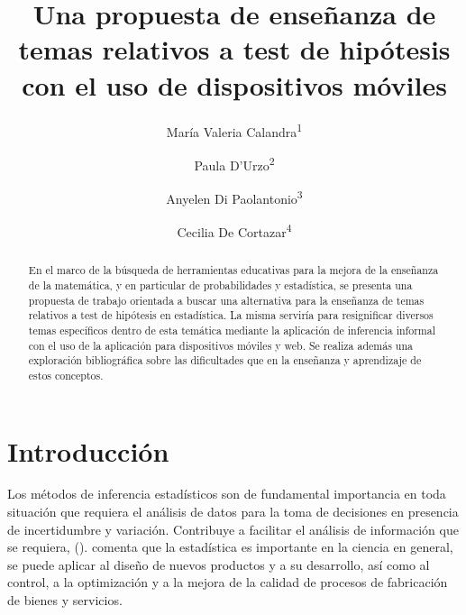 \documentclass[oneside,spanish]{amsart}
\numberwithin{equation}{section}
\theoremstyle{definition}
\begin{document}
	
\title[Una propuesta de enseñanza de temas relativos a test de hipótesis con el uso de dispositivos móviles]{Una propuesta de enseñanza de temas relativos a test de hipótesis con el uso de dispositivos móviles\vspace{-2ex}}
\author[1]{María Valeria Calandra\textsuperscript{1}}
\address[1,3,4]{UIDET GAMEFI, Dto. Ciencias Básicas, Facultad de Ingeniería, Universidad Nacional de La Plata}
\author[2]{Paula D'Urzo\textsuperscript{2}}
\address[2]{Dto. Ciencias Básicas, Facultad de Ingeniería, Universidad Nacional de La Plata}
\author[3]{Anyelen Di Paolantonio\textsuperscript{3}}
\author[4]{Cecilia De Cortazar\textsuperscript{4}}

\begin{abstract}
	En el marco de la búsqueda de herramientas educativas para la mejora de la enseñanza de la matemática, y en particular de probabilidades y estadística, se presenta una propuesta de trabajo orientada a buscar una alternativa para la enseñanza de temas relativos a test de hipótesis en estadística. La misma serviría para resignificar diversos temas específicos dentro de esta temática mediante la aplicación de inferencia informal con el uso de la aplicación para dispositivos móviles y web. Se realiza además una exploración bibliográfica sobre las dificultades que en la enseñanza y aprendizaje de estos conceptos.    
\end{abstract}

\maketitle
\thispagestyle{empty}

\section{Introducción}

Los métodos de inferencia estadísticos son de fundamental importancia en toda situación que requiera el análisis de datos para la toma de decisiones en presencia de incertidumbre y variación. Contribuye a facilitar el análisis de información que se requiera, (\citet{vanderman02}). \citet{viles07} comenta que la estadística es importante en la ciencia en general, se puede aplicar al diseño de nuevos productos y a su desarrollo, así como al control, a la optimización y a la mejora de la calidad de procesos de fabricación de bienes y servicios.
\end{document}
